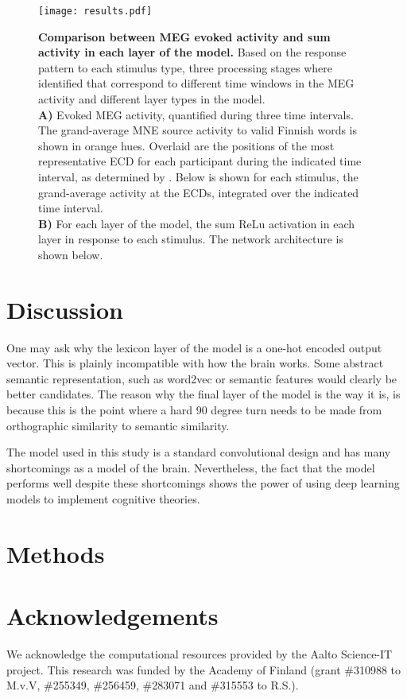 \documentclass[a4paper, 10pt]{vanvliet_paper}
\begin{document}
\begin{figure}
    \texttt{[image: results.pdf]}
    \vspace{2ex}
    \caption{
        \textbf{Comparison between \gls{MEG} evoked activity and sum activity in each layer of the model.}
        Based on the response pattern to each stimulus type, three processing stages where identified that correspond to different time windows in the \gls{MEG} activity and different layer types in the model.\\
        \textbf{A)} Evoked \gls{MEG} activity, quantified during three time intervals.
        The grand-average \gls{MNE} source activity to valid Finnish words is shown in orange hues.
        Overlaid are the positions of the most representative \gls{ECD} for each participant during the indicated time interval, as determined by \textcite{Vartiainen2011}.
        Below is shown for each stimulus, the grand-average activity at the \glspl{ECD}, integrated over the indicated time interval.\\
        \textbf{B)} For each layer of the model, the sum \gls{ReLu} activation in each layer in response to each stimulus.
        The network architecture is shown below.
    }\label{fig:results}
\end{figure}

\section{Discussion}
One may ask why the lexicon layer of the model is a one-hot encoded output vector.
This is plainly incompatible with how the brain works.
Some abstract semantic representation, such as word2vec or semantic features would clearly be better candidates.
The reason why the final layer of the model is the way it is, is because this is the point where a hard 90 degree turn needs to be made from orthographic similarity to semantic similarity.

The model used in this study is a standard convolutional design and has many shortcomings as a model of the brain.
Nevertheless, the fact that the model performs well despite these shortcomings shows the power of using deep learning models to implement cognitive theories.

\section{Methods}
\section{Acknowledgements}
We acknowledge the computational resources provided by the Aalto Science-IT project.
This research was funded by the Academy of Finland (grant \#310988 to M.v.V, \#255349, \#256459, \#283071 and \#315553 to R.S.).

\newpage
\printbibliography{}
\end{document}
